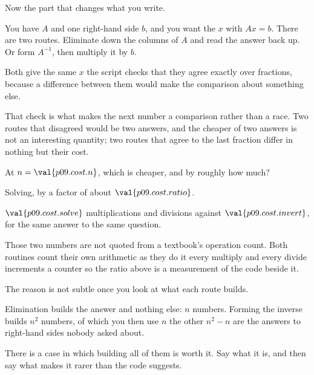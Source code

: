 \begin{fr}
Now the part that changes what you write.

You have $A$ and one right-hand side $b$, and you want the $x$ with $Ax = b$.
There are two routes. Eliminate down the columns of $A$ and read the answer back
up. Or form $A^{-1}$, then multiply it by $b$.

Both give the same $x$ \dash{} the script checks that they agree exactly over
fractions, because a difference between them would make the comparison about
something else.

That check is what makes the next number a comparison rather than a race. Two
routes that disagreed would be two answers, and the cheaper of two answers is
not an interesting quantity; two routes that agree to the last fraction differ
in nothing but their cost.

At $n = \val{p09.cost.n}$, which is cheaper, and by roughly how much?
\dotline
\nextframe
\end{fr}

\begin{fr}
\begin{ansblock}
Solving, by a factor of about $\val{p09.cost.ratio}$.
\end{ansblock}

$\val{p09.cost.solve}$ multiplications and divisions against
$\val{p09.cost.invert}$, for the same answer to the same question.

Those two numbers are not quoted from a textbook's operation count. Both
routines count their own arithmetic as they do it \dash{} every multiply and
every divide increments a counter \dash{} so the ratio above is a
measurement of the code beside it.
\end{fr}


\begin{fr}
The reason is not subtle once you look at what each route builds.

Elimination builds the answer and nothing else: $n$ numbers. Forming the
inverse builds $n^{2}$ numbers, of which you then use $n$ \dash{} the other
$n^{2} - n$ are the answers to right-hand sides nobody asked about.

There is a case in which building all of them is worth it. Say what it is, and
then say what makes it rarer than the code suggests.
\dotline
\nextframe
\end{fr}

